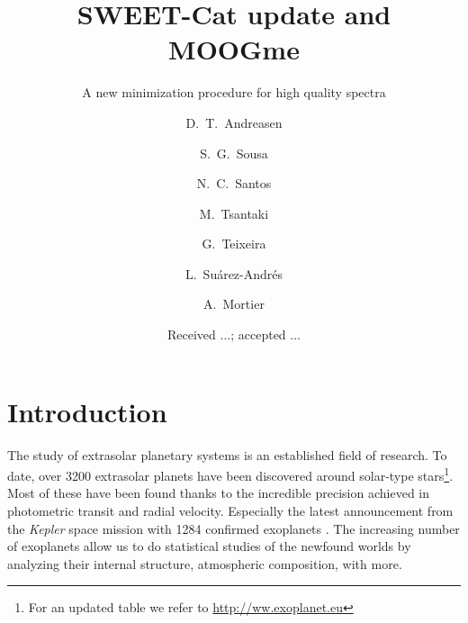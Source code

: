 \documentclass{aa}
\begin{document}
\title{SWEET-Cat update and MOOGme}
\subtitle{A new minimization procedure for high quality spectra}


\author{ D.~T.~Andreasen
    \and S.~G.~Sousa
    \and N.~C.~Santos
    \and M.~Tsantaki
    \and G.~Teixeira
    \and L.~Su\'arez-Andr\'es
    \and A.~Mortier
}







\date{Received ...; accepted ...}

\abstract
{}
{}
{}
{}
{}



\maketitle



\section{Introduction}
\label{sec:introduction}
The study of extrasolar planetary systems is an established field of research.
To date, over 3200 extrasolar planets have been discovered around solar-type
stars\footnote{For an updated table we refer to \url{http://ww.exoplanet.eu}}.
Most of these have been found thanks to the incredible precision achieved in
photometric transit and radial velocity. Especially the latest announcement
from the \emph{Kepler} space mission with 1284 confirmed exoplanets
\citep{Morton2016}. The increasing number of exoplanets allow us to do
statistical studies of the newfound worlds by analyzing their internal
structure, atmospheric composition, with more.
\end{document}
